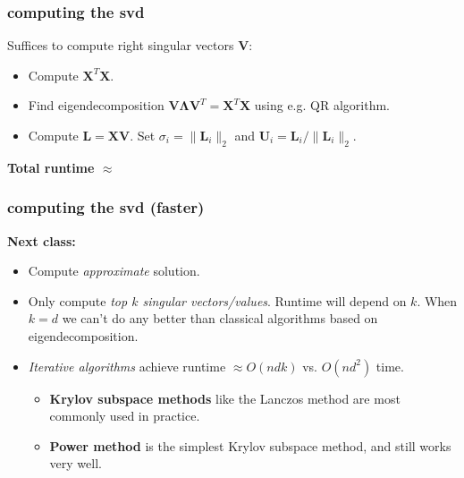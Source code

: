 \documentclass[compress]{beamer}
\newcommand{\bs}[1]{\boldsymbol{#1}}
\newcommand{\bv}[1]{\mathbf{#1}}
\newcommand{\R}{\mathbb{R}}
\begin{document}
\begin{frame}[t]
	\frametitle{computing the svd}
	Suffices to compute right singular vectors $\bv{V}$:
	\begin{itemize}
		\item Compute $\bv{X}^T\bv{X}$.
		\item Find eigendecomposition $\bv{V}\bs{\Lambda}\bv{V}^T = \bv{X}^T\bv{X}$ using e.g. QR algorithm.
		\item Compute $\bv{L} = \bv{X}\bv{V}$. Set $\sigma_i = \|\bv{L}_i\|_2$ and $\bv{U}_i = \bv{L}_i/\|\bv{L}_i\|_2$.
	\end{itemize}

\vspace{2em}
\begin{center}
	\hspace{-3em} \alert{\textbf{Total runtime $\approx$}}
\end{center}
\end{frame}

\begin{frame}[t]
	\frametitle{computing the svd (faster)}
	\textbf{Next class:}
	\begin{itemize}
		\item Compute \emph{approximate} solution.
		\item Only compute \emph{top $k$ singular vectors/values}. Runtime will depend on $k$. When $k = d$ we can't do any better than classical algorithms based on eigendecomposition.
		\item \emph{Iterative algorithms} achieve runtime $\approx O(ndk)$ vs. $O(nd^2)$ time.  
		\begin{itemize}
			\item \textbf{Krylov subspace methods} like the Lanczos method are most commonly used in practice. 
			\item \textbf{Power method} is the simplest Krylov subspace method, and still works very well. 
		\end{itemize}
	\end{itemize}
\end{frame}

	
	
	
\end{document}
